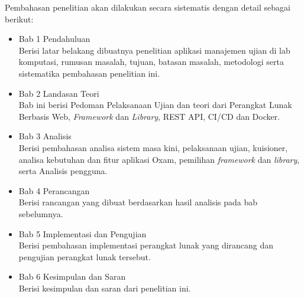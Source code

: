 Pembahasan penelitian akan dilakukan secara sistematis dengan detail sebagai
berikut:

\begin{itemize}
    \item Bab 1 Pendahuluan \\
        Berisi latar belakang dibuatnya penelitian aplikasi manajemen ujian di lab komputasi, 
        rumusan masalah, tujuan, batasan masalah, metodologi serta sistematika pembahasan penelitian ini.
    
    \item Bab 2 Landasan Teori \\
        Bab ini berisi Pedoman Pelaksanaan Ujian dan teori dari Perangkat Lunak
        Berbasis Web, \textit{Framework} dan
        \textit{Library}, REST API, CI/CD dan Docker.
        
    \item Bab 3 Analisis \\
        Berisi pembahasan analisa sistem masa kini, pelaksanaan ujian,
        kuisioner, analisa kebutuhan dan fitur aplikasi Oxam, pemilihan
        \textit{framework} dan \textit{library}, serta Analisis pengguna.
        
    \item Bab 4 Perancangan \\
        Berisi rancangan yang dibuat berdasarkan hasil analisis pada bab
        sebelumnya.
    
    \item Bab 5 Implementasi dan Pengujian \\
        Berisi pembahasan implementasi perangkat lunak yang dirancang dan
        pengujian perangkat lunak tersebut.
        
    \item Bab 6 Kesimpulan dan Saran \\
        Berisi kesimpulan dan saran dari penelitian ini.
\end{itemize}